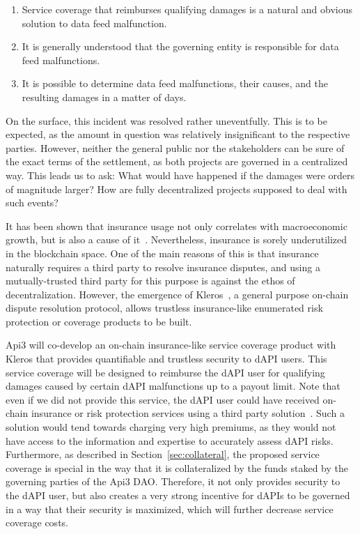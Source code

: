 \documentclass[11pt]{article}
\begin{document}
\begin{enumerate}
    \item Service coverage that reimburses qualifying damages is a natural and obvious solution to data feed malfunction.
    \item It is generally understood that the governing entity is responsible for data feed malfunctions.
    \item It is possible to determine data feed malfunctions, their causes, and the resulting damages in a matter of days.
\end{enumerate}

On the surface, this incident was resolved rather uneventfully.
This is to be expected, as the amount in question was relatively insignificant to the respective parties.
However, neither the general public nor the stakeholders can be sure of the exact terms of the settlement, as both projects are governed in a centralized way.
This leads us to ask: What would have happened if the damages were orders of magnitude larger?
How are fully decentralized projects supposed to deal with such events?

It has been shown that insurance usage not only correlates with macroeconomic growth, but is also a cause of it~\cite{outreville:2013}.
Nevertheless, insurance is sorely underutilized in the blockchain space.
One of the main reasons of this is that insurance naturally requires a third party to resolve insurance disputes, and using a mutually-trusted third party for this purpose is against the ethos of decentralization.
However, the emergence of Kleros~\cite{kleros:2019}, a general purpose on-chain dispute resolution protocol, allows trustless insurance-like enumerated risk protection or coverage products to be built.

Api3 will co-develop an on-chain insurance-like service coverage product with Kleros that provides quantifiable and trustless security to dAPI users.
This service coverage will be designed to reimburse the dAPI user for qualifying damages caused by certain dAPI malfunctions up to a payout limit.
Note that even if we did not provide this service, the dAPI user could have received on-chain insurance or risk protection services using a third party solution~\cite{nexus-mutual}.
Such a solution would tend towards charging very high premiums, as they would not have access to the information and expertise to accurately assess dAPI risks.
Furthermore, as described in Section~\ref{sec:collateral}, the proposed service coverage is special in the way that it is collateralized by the funds staked by the governing parties of the Api3 DAO.
Therefore, it not only provides security to the dAPI user, but also creates a very strong incentive for dAPIs to be governed in a way that their security is maximized, which will further decrease service coverage costs.
\end{document}
